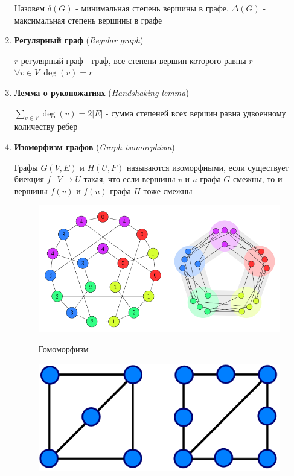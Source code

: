 \documentclass[12pt]{article}
\begin{document}
\begin{enumerate}
        Назовем $\delta(G)$ - минимальная степень вершины в графе, $\Delta(G)$ - максимальная степень вершины в графе

        \item \textbf{Регулярный граф} (\textit{Regular graph})

        $r$-регулярный граф - граф, все степени вершин которого равны $r$ - $\forall v \in V \ \deg(v) = r$

        \item \textbf{Лемма о рукопожатиях} (\textit{Handshaking lemma})

        $\sum_{v \in V} \deg(v) = 2|E|$ - сумма степеней всех вершин равна удвоенному количеству ребер

        \item \textbf{Изоморфизм графов} (\textit{Graph isomorphism})

        Графы $G(V, E)$ и $H(U, F)$ называются изоморфными, если существует биекция $f \ | \ V \to U$ такая, что
        если вершины $v$ и $u$ графа $G$ смежны, то и вершины $f(v)$ и $f(u)$ графа $H$ тоже смежны

        \begin{minipage}{\linewidth}
            \begin{figure}
                \begin{center}
                    \includegraphics[width=\linewidth]{dismath/images/dismath_exam_list_graph_homomorphism}

                    Гомоморфизм

                    \smallvspace

                    \includegraphics[width=\linewidth]{dismath/images/dismath_exam_list_graph_homeomorphism}


\end{center}
\end{figure}
\end{minipage}
\end{enumerate}
\end{document}
